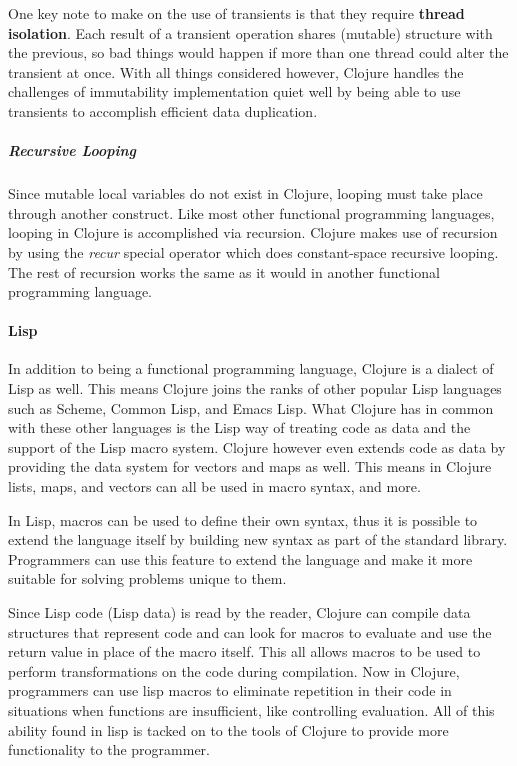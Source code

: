     One key note to make on the use of transients is that they require \textbf{thread isolation}. Each result of a transient operation shares (mutable) structure with the previous, so bad things would happen if more than one thread could alter the transient at once. With all things considered however, Clojure handles the challenges of immutability implementation quiet well by being able to use transients to accomplish efficient data duplication. \cite{clojure_website:reference}
    
    \subparagraph{Recursive Looping}
    
    Since mutable local variables do not exist in Clojure, looping must take place through another construct. Like most other functional programming languages, looping in Clojure is accomplished via recursion. Clojure makes use of recursion by using the \textit{recur} special operator which does constant-space recursive looping. The rest of recursion works the same as it would in another functional programming language. \cite{clojure_website:functional-programming}

\paragraph{Lisp}

    In addition to being a functional programming language, Clojure is a dialect of Lisp as well. This means Clojure joins the ranks of other popular Lisp languages such as Scheme, Common Lisp, and Emacs Lisp. What Clojure has in common with these other languages is the Lisp way of treating code as data and the support of the Lisp macro system. Clojure however even extends code as data by providing the data system for vectors and maps as well. This means in Clojure lists, maps, and vectors can all be used in macro syntax, and more.
    
    In Lisp, macros can be used to define their own syntax, thus it is possible to extend the language itself by building new syntax as part of the standard library. Programmers can use this feature to extend the language and make it more suitable for solving problems unique to them.  \cite{PracticalCommonLisp_Book_PeterSeibel}
    
    Since Lisp code (Lisp data) is read by the reader, Clojure can compile data structures that represent code and can look for macros to evaluate and use the return value in place of the macro itself. This all allows macros to be used to perform transformations on the code during compilation. Now in Clojure, programmers can use lisp macros to eliminate repetition in their code in situations when functions are insufficient, like controlling evaluation. All of this ability found in lisp is tacked on to the tools of Clojure to provide more functionality to the programmer.
    \cite{clojure_website:lisp}

